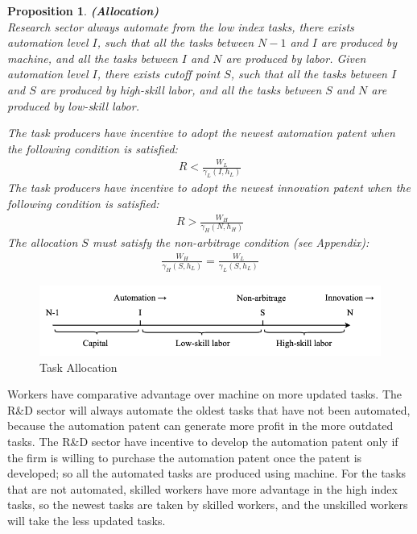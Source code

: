 \documentclass[12pt]{article}
\newtheorem{proposition}{Proposition}
\begin{document}
\begin{proposition}{\bf (Allocation)} \\

Research sector always automate from the low index tasks, there exists automation level $I$, such that all the tasks between $N-1$ and $I$ are produced by machine, and all the tasks between $I$ and $N$ are produced by labor. Given automation level $I$, there exists cutoff point $S$, such that all the tasks between $I$ and $S$ are produced by high-skill labor, and all the tasks between $S$ and $N$ are produced by low-skill labor. 

The task producers have incentive to adopt the newest automation patent when the following condition is satisfied:
\begin{align*}
R < \frac{W_L}{\gamma_L(I,h_L)}
\end{align*}
The task producers have incentive to adopt the newest innovation patent when the following condition is satisfied: 
\begin{align*}
R > \frac{W_H}{\gamma_H(N,h_H)}
\end{align*}
The allocation $S$ must satisfy the non-arbitrage condition (see Appendix): 
\begin{align*}
\frac{W_H}{\gamma_H(S,h_L)} = \frac{W_L}{\gamma_L(S,h_L)}
\end{align*}
\end{proposition}

\begin{figure}
\includegraphics[width=\textwidth]{allocation}
\caption{Task Allocation}
\label{allocation}
\end{figure}
Workers have comparative advantage over machine on more updated tasks. The R\&D sector will always automate the oldest tasks that have not been automated, because the automation patent can generate more profit in the more outdated tasks. The R\&D sector have incentive to develop the automation patent only if the firm is willing to purchase the automation patent once the patent is developed; so all the automated tasks are produced using machine. For the tasks that are not automated, skilled workers have more advantage in the high index tasks, so the newest tasks are taken by skilled workers, and the unskilled workers will take the less updated tasks. 
\end{document}
